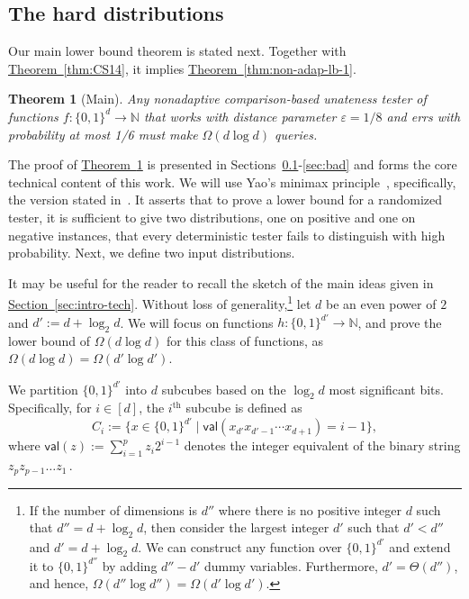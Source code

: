 \documentclass[11pt]{article}
\numberwithin{equation}{section}
\newtheorem{theorem}{Theorem}[section]
\theoremstyle{definition}
\theoremstyle{plain}
\newcommand{\N}{\mathbb N}
\newcommand{\expref}[2]{\hyperref[#2]{#1~\ref{#2}}}
\newcommand{\eps}{\varepsilon}
\newcommand{\ord}[2][th]{\ensuremath{{#2}^{\mathrm{#1}}}}
\newcommand{\dd}{\ensuremath{{d'}}}
\newcommand{\dec}{\mathsf{val}}
\newcommand{\Sec}[1]{\expref{Section}{sec:#1}}
\newcommand{\Thm}[1]{\expref{Theorem}{thm:#1}}
\begin{document}
\subsection{The hard distributions} \label{sec:hard-dist}
Our main lower bound theorem is stated next. Together with \Thm{CS14}, it implies \Thm{non-adap-lb-1}.

\begin{theorem}[Main]\label{thm:non-adap-lb}
Any nonadaptive comparison-based unateness tester of functions $f:\{0,1\}^d\to \N$ that works with distance parameter $\eps=1/8$ and errs with probability at most 1/6 must make $\Omega(d\log d)$ queries.
\end{theorem}

The proof of \Thm{non-adap-lb} is presented in Sections~\ref{sec:hard-dist}-\ref{sec:bad} and forms the core technical content of this work.
We will use Yao's minimax principle~\cite{Yao77}, specifically, the version stated in~\cite[Claim~5]{RS06}. It asserts that to prove a lower bound for a randomized tester, it is sufficient to give two distributions,
%
%
%
%
one on positive and one on negative instances,
%
that every deterministic tester fails to distinguish 
with high probability.
%
%
Next, we define two input distributions.

It may be useful for the reader to recall the  sketch of the main 
ideas given in \Sec{intro-tech}.
%
Without loss of generality,\footnote
{If the number of dimensions is $d''$ where there is no positive integer $d$ such that $d'' = d + \log_2 d$, then consider the largest integer $d'$ such that $d' < d''$ and $d' = d + \log_2 d$. We can construct any function over $\{0,1\}^{d'}$ and extend it to $\{0,1\}^{d''}$ by adding $d'' - d'$ dummy variables.
%
Furthermore, $d' = \Theta(d'')$, and hence, $\Omega(d'' \log d'') = \Omega(d' \log d')$.}
let $d$ be an even power of $2$ and $d' := d+\log_2d$.
We will focus on functions $h:\{0,1\}^{d'} \to \N$,
and prove the lower bound of $\Omega(d \log d)$ for this class of functions,
as $\Omega(d \log d) = \Omega(d' \log d')$.


We partition $\{0,1\}^\dd$ into $d$ subcubes based on the $\log_2 d$ most significant bits.
Specifically, for $i \in [d]$, the $\ord{i}$ subcube is defined as
\[C_i := \{x\in \{0,1\}^\dd \mid \dec(x_{d'}x_{d'-1}\cdots x_{d+1}) = i - 1\},\]
where $\dec(z) := \sum_{i = 1}^p z_i 2^{i-1}$ denotes the integer equivalent 
of the binary string $z_p z_{p-1} \ldots z_1$\,. %
\end{document}
